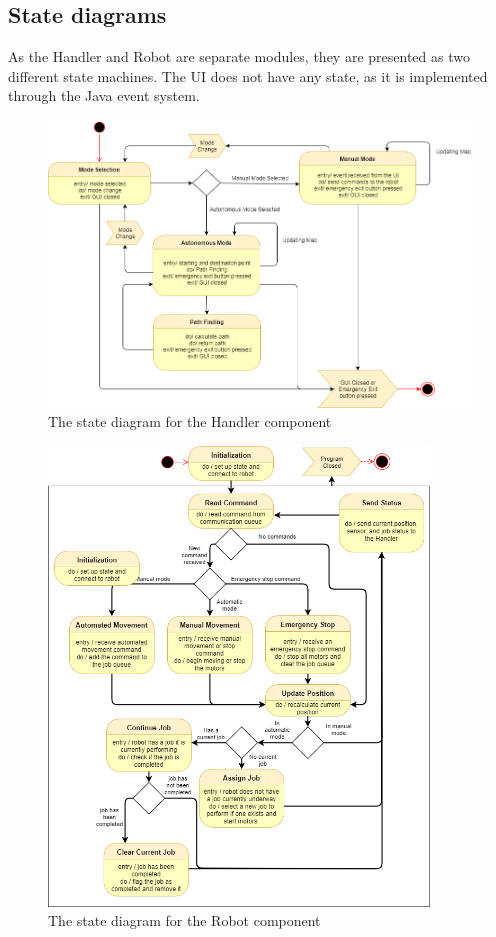 \documentclass[12pt,a4paper]{article}
\begin{document}
\subsection{State diagrams}
As the Handler and Robot are separate modules, they are presented as two different state machines. The UI does not have any state, as it is implemented through the Java event system.
\begin{figure}[H]
	\caption{The state diagram for the Handler component}
	\centering
		\includegraphics[width=1.0\textwidth]{HandlerState.png}
\end{figure}
\begin{figure}[H]
	\caption{The state diagram for the Robot component}
	\centering
		\includegraphics[width=0.9\textwidth]{RobotState.png}
\end{figure}
\end{document}
